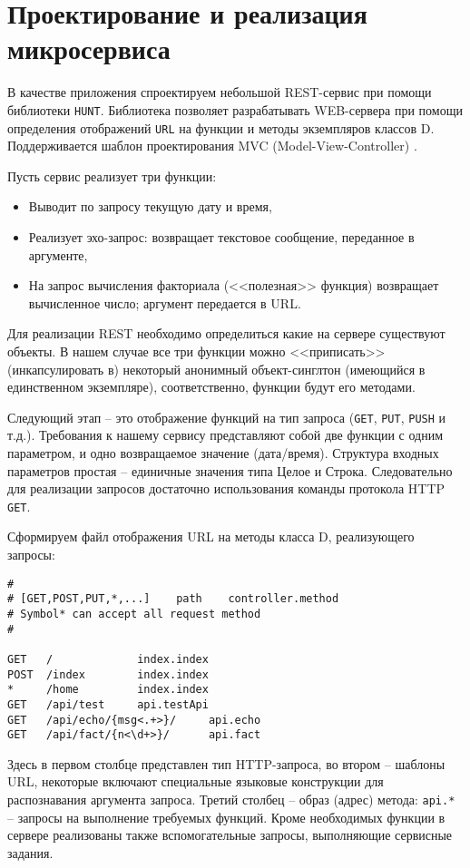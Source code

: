 \documentclass[732]{studrep}
\begin{document}
\chapter{Проектирование и реализация микросервиса}

В качестве приложения спроектируем небольшой REST-сервис при помощи библиотеки \texttt{HUNT}.  Библиотека позволяет разрабатывать WEB-сервера при помощи определения отображений \texttt{URL} на функции и методы экземпляров классов D.  Поддерживается шаблон проектирования MVC (Model-View-Controller) \cite{mvc}.

Пусть сервис реализует три функции:
\begin{itemize}
\item Выводит по запросу текущую дату и время,
\item Реализует эхо-запрос: возвращает текстовое сообщение, переданное в аргументе,
\item На запрос вычисления факториала (<<полезная>> функция) возвращает вычисленное число; аргумент передается в URL.
\end{itemize}

Для реализации REST необходимо определиться какие на сервере существуют объекты.  В нашем случае все три функции можно <<приписать>> (инкапсулировать в) некоторый анонимный объект-синглтон (имеющийся в единственном экземпляре), соответственно, функции будут его методами.

Следующий этап -- это отображение функций на тип запроса (\texttt{GET}, \texttt{PUT}, \texttt{PUSH} и т.д.).  Требования к нашему сервису представляют собой две функции с одним параметром, и одно возвращаемое значение (дата/время).  Структура входных параметров простая -- единичные значения типа Целое и Строка.  Следовательно для реализации запросов достаточно использования команды протокола HTTP \texttt{GET}.


Сформируем файл отображения URL на методы класса D, реализующего запросы:
\begin{verbatim}
#
# [GET,POST,PUT,*,...]    path    controller.method
# Symbol* can accept all request method
#

GET   /             index.index
POST  /index        index.index
*     /home         index.index
GET   /api/test     api.testApi
GET   /api/echo/{msg<.+>}/     api.echo
GET   /api/fact/{n<\d+>}/      api.fact
\end{verbatim}
Здесь в первом столбце представлен тип HTTP-запроса, во втором -- шаблоны URL, некоторые включают специальные языковые конструкции для распознавания аргумента запроса. Третий столбец -- образ (адрес) метода: \texttt{api.*} -- запросы на выполнение требуемых функций.  Кроме необходимых функции в сервере реализованы также вспомогательные запросы, выполняющие сервисные задания.
\end{document}
